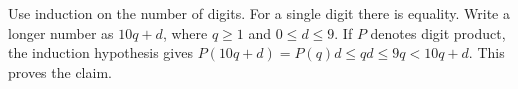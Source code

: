 Use induction on the number of digits. For a single digit there is equality. Write a longer number as $10q+d$, where $q\ge1$ and $0\le d\le9$. If $P$ denotes digit product, the induction hypothesis gives $P(10q+d)=P(q)d\le qd\le9q<10q+d$. This proves the claim.
